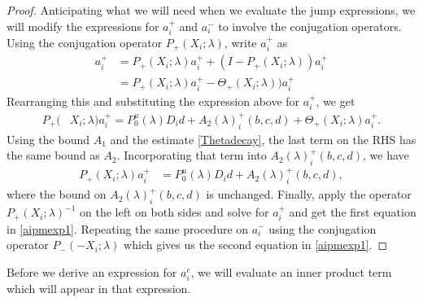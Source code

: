 \documentclass[thesis.tex]{subfiles}
\begin{document}
\begin{lemma}
\begin{proof}
Anticipating what we will need when we evaluate the jump expressions, we will modify the expressions for $a_i^+$ and $a_i^-$ to involve the conjugation operators. Using the conjugation operator $P_+(X_i; \lambda)$, write $a_i^+$ as
\begin{align*}
a_i^+ &= P_+(X_i; \lambda)a_i^+ + (I - P_+(X_i; \lambda))a_i^+ \\
&= P_+(X_i; \lambda)a_i^+ - \Theta_+(X_i; \lambda))a_i^+
\end{align*}
Rearranging this and substituting the expression above for $a_i^+$, we get
\begin{align*}
P_+(&X_i; \lambda) a_i^+ = P_0^u(\lambda) D_i d + A_2(\lambda)_i^+(b, c, d) + \Theta_+(X_i; \lambda)a_i^+.
\end{align*}
Using the bound $A_1$ and the estimate \eqref{Thetadecay}, the last term on the RHS has the same bound as $A_2$. Incorporating that term into $A_2(\lambda)_i^+(b, c, d)$, we have
\begin{align*}
P_+(X_i; \lambda)a_i^+ &= P_0^u(\lambda) D_i d + A_2(\lambda)_i^+(b, c, d),
\end{align*}
where the bound on $A_2(\lambda)_i^+(b, c, d)$ is unchanged. Finally, apply the operator $P_+(X_i; \lambda)^{-1}$ on the left on both sides and solve for $a_i^+$ and get the first equation in \cref{aipmexp1}. Repeating the same procedure on $a_i^-$ using the conjugation operator $P_-(-X_i; \lambda)$ which gives us the second equation in \cref{aipmexp1}.
\end{proof}
\end{lemma}

Before we derive an expression for $a_i^c$, we will evaluate an inner product term which will appear in that expression.
\end{document}
